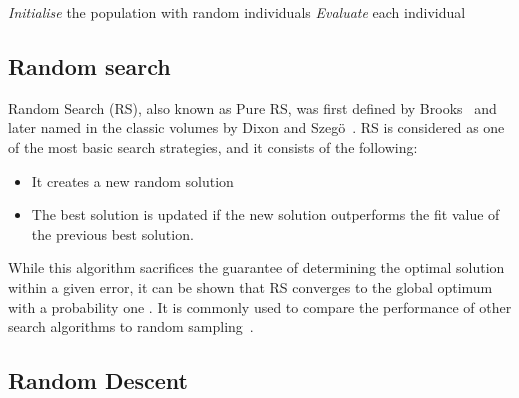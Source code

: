 
\begin{algorithm}[H]
\caption{Evolution Strategy Algorithm}
\label{evolution_alg}
\SetAlgoLined
    \textit{Initialise} the population with random individuals\;
    \textit{Evaluate} each individual
\end{algorithm}

\subsection{Random search} 

Random Search (RS), also known as Pure RS, was first defined by Brooks~\cite{10.2307/167616} and later named in the classic volumes by Dixon and Szeg{\"o}~\cite{doi:10.1002/zamm.19790590220}. RS is considered as one of the most basic search strategies, and it consists of the following:

\begin{itemize}
    \item It creates a new random solution
    \item The best solution is updated if the new solution outperforms the fit value of the previous best solution.
\end{itemize}

While this algorithm sacrifices the guarantee of determining the optimal solution within a given error, it can be shown that RS converges to the global optimum with a probability one \cite{zabinsky2013stochastic}. It is commonly used to compare the performance of other search algorithms to random sampling~\cite{de2017james}.

\subsection{Random Descent} 

